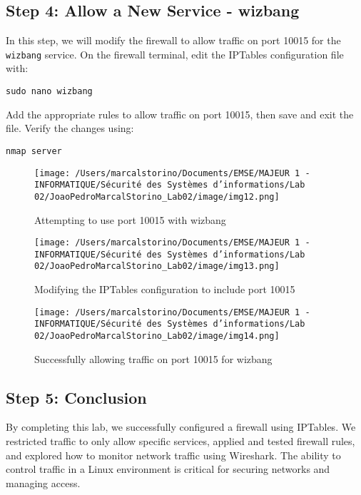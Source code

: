 \documentclass[a4paper,12pt]{article} %
\begin{document}
\subsection*{Step 4: Allow a New Service - wizbang}
In this step, we will modify the firewall to allow traffic on port 10015 for the \texttt{wizbang} service. On the firewall terminal, edit the IPTables configuration file with:

\begin{verbatim}
sudo nano wizbang
\end{verbatim}

Add the appropriate rules to allow traffic on port 10015, then save and exit the file. Verify the changes using:

\begin{verbatim}
nmap server
\end{verbatim}

\begin{figure}[h!]
\centering
\texttt{[image: /Users/marcalstorino/Documents/EMSE/MAJEUR 1 - INFORMATIQUE/Sécurité des Systèmes d'informations/Lab 02/JoaoPedroMarcalStorino\_Lab02/image/img12.png]} %
\caption{Attempting to use port 10015 with wizbang}
\end{figure}

\begin{figure}[h!]
\centering
\texttt{[image: /Users/marcalstorino/Documents/EMSE/MAJEUR 1 - INFORMATIQUE/Sécurité des Systèmes d'informations/Lab 02/JoaoPedroMarcalStorino\_Lab02/image/img13.png]} %
\caption{Modifying the IPTables configuration to include port 10015}
\end{figure}

\begin{figure}[h!]
\centering
\texttt{[image: /Users/marcalstorino/Documents/EMSE/MAJEUR 1 - INFORMATIQUE/Sécurité des Systèmes d'informations/Lab 02/JoaoPedroMarcalStorino\_Lab02/image/img14.png]} %
\caption{Successfully allowing traffic on port 10015 for wizbang}
\end{figure}

\subsection*{Step 5: Conclusion}
By completing this lab, we successfully configured a firewall using IPTables. We restricted traffic to only allow specific services, applied and tested firewall rules, and explored how to monitor network traffic using Wireshark. The ability to control traffic in a Linux environment is critical for securing networks and managing access.
\end{document}
